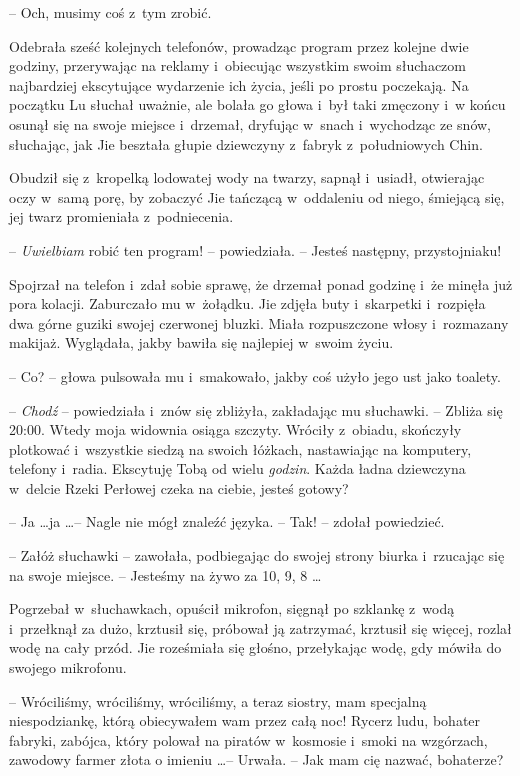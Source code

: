\documentclass[oneside,polish,11pt,rmheadings]{mwbk}
\begin{document}
-- Och, musimy coś z~tym zrobić.

Odebrała sześć kolejnych telefonów, prowadząc program przez kolejne dwie godziny, przerywając na reklamy i~obiecując wszystkim swoim słuchaczom najbardziej ekscytujące wydarzenie ich życia, jeśli po prostu poczekają. Na początku Lu słuchał uważnie, ale bolała go głowa i~był taki zmęczony i~w końcu osunął się na swoje miejsce i~drzemał, dryfując w~snach i~wychodząc ze snów, słuchając, jak Jie beształa głupie dziewczyny z~fabryk z~południowych Chin.

Obudził się z~kropelką lodowatej wody na twarzy, sapnął i~usiadł, otwierając oczy w~samą porę, by zobaczyć Jie tańczącą w~oddaleniu od niego, śmiejącą się, jej twarz promieniała z~podniecenia. 

-- \textit{Uwielbiam }robić ten program! -- powiedziała. -- Jesteś następny, przystojniaku! 

Spojrzał na telefon i~zdał sobie sprawę, że drzemał ponad godzinę i~że minęła już pora kolacji. Zaburczało mu w~żołądku. Jie zdjęła buty i~skarpetki i~rozpięła dwa górne guziki swojej czerwonej bluzki. Miała rozpuszczone włosy i~rozmazany makijaż. Wyglądała, jakby bawiła się najlepiej w~swoim życiu. 

-- Co? -- głowa pulsowała mu i~smakowało, jakby coś użyło jego ust jako toalety.

-- \textit{Chodź }-- powiedziała i~znów się zbliżyła, zakładając mu słuchawki. -- Zbliża się 20:00. Wtedy moja widownia osiąga szczyty. Wróciły z~obiadu, skończyły plotkować i~wszystkie siedzą na swoich łóżkach, nastawiając na komputery, telefony i~radia. Ekscytuję Tobą od wielu \textit{godzin}. Każda ładna dziewczyna w~delcie Rzeki Perłowej czeka na ciebie, jesteś gotowy?

-- Ja \ldots  ja \ldots  -- Nagle nie mógł znaleźć języka. -- Tak! -- zdołał powiedzieć.

-- Załóż słuchawki -- zawołała, podbiegając do swojej strony biurka i~rzucając się na swoje miejsce. -- Jesteśmy na żywo za 10, 9, 8 \ldots  

Pogrzebał w~słuchawkach, opuścił mikrofon, sięgnął po szklankę z~wodą i~przełknął za dużo, krztusił się, próbował ją zatrzymać, krztusił się więcej, rozlał wodę na cały przód. Jie roześmiała się głośno, przełykając wodę, gdy mówiła do swojego mikrofonu.

-- Wróciliśmy, wróciliśmy, wróciliśmy, a teraz siostry, mam specjalną niespodziankę, którą obiecywałem wam przez całą noc! Rycerz ludu, bohater fabryki, zabójca, który polował na piratów w~kosmosie i~smoki na wzgórzach, zawodowy farmer złota o imieniu \ldots  -- Urwała. -- Jak mam cię nazwać, bohaterze?
\end{document}
